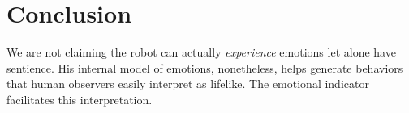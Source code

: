 \documentclass[runningheads]{llncs}
\begin{document}
\section{Conclusion}

We are not claiming the robot can actually \textit{experience} emotions let alone have sentience. 
His internal model of emotions, nonetheless, helps generate behaviors that human observers easily interpret as lifelike. 
The emotional indicator facilitates this interpretation. 

\begin{credits}


\end{credits}
%
%
%


%
\end{document}
